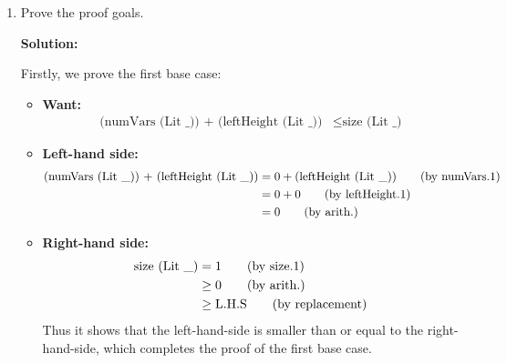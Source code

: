 \documentclass[11pt]{article}
\theoremstyle{definition}
\begin{document}
\begin{enumerate}
\begin{enumerate}
\item Prove the proof goals.

\textbf{Solution:}

Firstly, we prove the first base case:
\begin{itemize}
\item \textbf{Want:}
\begin{align*}
\text{(numVars (Lit \_)) + (leftHeight (Lit \_))} &\leq \text{size (Lit \_)}
\end{align*}
\item \textbf{Left-hand side:}
\begin{align*}
\text{(numVars (Lit \_)) + (leftHeight (Lit \_))} &= 0 + \text{(leftHeight (Lit \_))} \tag{\text{by numVars.1}} \\
                                                  &= 0 + 0 \tag{\text{by leftHeight.1}} \\
                                                  &= 0 \tag{\text{by arith.}}
\end{align*}
\item \textbf{Right-hand side:}
\begin{align*}
\text{size (Lit \_)} &= 1 \tag{\text{by size.1}} \\
                     &\geq 0 \tag{\text{by arith.}} \\
							       &\geq \text{L.H.S} \tag{\text{by replacement}}
\end{align*}
Thus it shows that the left-hand-side is smaller than or equal to the right-hand-side, which completes the proof of the first base case.
\end{itemize}


\end{enumerate}
\end{enumerate}
\end{document}
